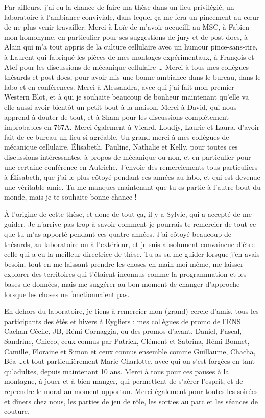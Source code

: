 Par ailleurs, j'ai eu la chance de faire ma thèse dans un lieu privilégié, un laboratoire à l'ambiance conviviale, dans lequel ça me fera un pincement au cœur de ne plus venir travailler. Merci à Loïc de m'avoir accueilli au MSC, à Fabien mon homonyme, en particulier pour ses suggestions de jury et de post-docs, à Alain qui m'a tout appris de la culture cellulaire avec un humour pince-sans-rire, à Laurent qui fabriqué les pièces de mes montages expérimentaux, à François et Atef pour les discussions de mécanique cellulaire \dots
Merci à tous mes collègues thésards et post-docs, pour avoir mis une bonne ambiance dans le bureau, dans le labo et en conférences. Merci à Alessandra, avec qui j'ai fait mon premier Western Blot, et à qui je souhaite beaucoup de bonheur maintenant qu'elle va elle aussi avoir bientôt un petit bout à la maison. Merci à David, qui nous apprend à douter de tout, et à Sham pour les discussions complètement improbables en 767A. Merci également à Vicard, Loudjy, Laurie et Laura, d'avoir fait de ce bureau un lieu si agréable. 
Un grand merci à mes collègues de mécanique cellulaire, Élisabeth, Pauline, Nathalie et Kelly, pour toutes ces discussions intéressantes, à propos de mécanique ou non, et en particulier pour une certaine conférence en Autriche. J'envoie des remerciements tous particuliers à Élisabeth, que j'ai le plus côtoyé pendant ces années au labo, et qui est devenue une véritable amie. Tu me manques maintenant que tu es partie à l'autre bout du monde, mais je te souhaite bonne chance !

À l'origine de cette thèse, et donc de tout ça, il y a Sylvie, qui a accepté de me guider. Je n'arrive pas trop à savoir comment je pourrais te remercier de tout ce que tu m'as apporté pendant ces quatre années. J'ai côtoyé beaucoup de thésards, au laboratoire ou à l'extérieur, et je suis absolument convaincue d'être celle qui a eu la meilleur directrice de thèse. Tu as su me guider lorsque j'en avais besoin, tout en me laissant prendre les choses en main moi-même, me laisser explorer des territoires qui t'étaient inconnus comme la programmation et les bases de données, mais me suggérer au bon moment de changer d'approche lorsque les choses ne fonctionnaient pas.

En dehors du laboratoire, je tiens à remercier mon (grand) cercle d'amis, tous les participants des étés et hivers à Eygliers : mes collègues de promo de l'ENS Cachan Cécile, JB, Rémi Cornaggia, ou des promos d'avant, Daniel, Pascal, Sandrine, Chicco, ceux connus par Patrick, Clément et Sabrina, Rémi Bonnet, Camille, Floraine et Simon et ceux connus ensemble comme Guillaume, Chacha, Béa \dots et tout particulièrement Marie-Charlotte, avec qui on s'est forgées en tant qu'adultes, depuis maintenant 10 ans. 
Merci à tous pour ces pauses à la montagne, à jouer et à bien manger, qui permettent de s'aérer l'esprit, et de reprendre le moral au moment opportun. Merci également pour toutes les soirées et dîners chez nous, les parties de jeu de rôle, les sorties au parc et les séances de couture.

